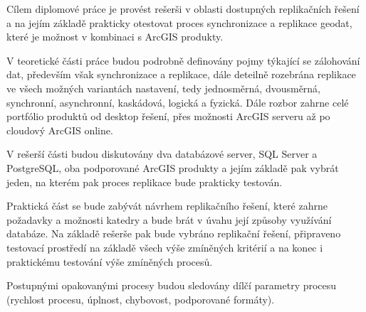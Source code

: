 Cílem diplomové práce je provést rešerši v oblasti dostupných replikačních řešení a na jejím základě prakticky otestovat proces synchronizace a replikace geodat, které je možnost v kombinaci s ArcGIS produkty.

V teoretické části práce budou podrobně definovány pojmy týkající se zálohování dat, především však synchronizace a replikace, dále deteilně rozebrána replikace ve všech možných variantách nastavení, tedy jednosměrná, dvousměrná, synchronní, asynchronní, kaskádová, logická a fyzická. Dále rozbor zahrne celé portfólio produktů od desktop řešení, přes možnosti ArcGIS serveru až po cloudový ArcGIS online.

V rešerší části budou diskutovány dva databázové server, SQL Server a PostgreSQL, oba podporované ArcGIS produkty a jejím základě pak vybrát jeden, na kterém pak proces replikace bude prakticky testován.

Praktická část se bude zabývát návrhem replikačního řešení, které zahrne požadavky a možnosti katedry a bude brát v úvahu její způsoby využívání databáze. Na základě rešerše pak bude vybráno replikační řešení, připraveno testovací prostředí na základě všech výše zmíněných kritérií a na konec i praktickému testování výše zmíněných procesů.

Postupnými opakovanými procesy budou sledovány dílčí parametry procesu (rychlost procesu, úplnost, chybovost, podporované formáty). 
